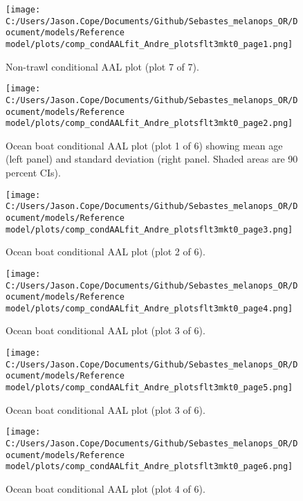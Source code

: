 \documentclass[11pt,
  english,
  letterpaper,
]{article}
\begin{document}
\begin{figure}
\centering
\texttt{[image: C:/Users/Jason.Cope/Documents/Github/Sebastes\_melanops\_OR/Document/models/Reference model/plots/comp\_condAALfit\_Andre\_plotsflt3mkt0\_page1.png]}
\caption{Non-trawl conditional AAL plot (plot 7 of 7).\label{fig:comp_condAALfit_Andre_plotsflt3mkt0_page1}}
\end{figure}

\begin{figure}
\centering
\texttt{[image: C:/Users/Jason.Cope/Documents/Github/Sebastes\_melanops\_OR/Document/models/Reference model/plots/comp\_condAALfit\_Andre\_plotsflt3mkt0\_page2.png]}
\caption{Ocean boat conditional AAL plot (plot 1 of 6) showing mean age (left panel) and standard deviation (right panel. Shaded areas are 90 percent CIs).\label{fig:comp_condAALfit_Andre_plotsflt3mkt0_page2}}
\end{figure}

\begin{figure}
\centering
\texttt{[image: C:/Users/Jason.Cope/Documents/Github/Sebastes\_melanops\_OR/Document/models/Reference model/plots/comp\_condAALfit\_Andre\_plotsflt3mkt0\_page3.png]}
\caption{Ocean boat conditional AAL plot (plot 2 of 6).\label{fig:comp_condAALfit_Andre_plotsflt3mkt0_page3}}
\end{figure}

\begin{figure}
\centering
\texttt{[image: C:/Users/Jason.Cope/Documents/Github/Sebastes\_melanops\_OR/Document/models/Reference model/plots/comp\_condAALfit\_Andre\_plotsflt3mkt0\_page4.png]}
\caption{Ocean boat conditional AAL plot (plot 3 of 6).\label{fig:comp_condAALfit_Andre_plotsflt3mkt0_page4}}
\end{figure}

\begin{figure}
\centering
\texttt{[image: C:/Users/Jason.Cope/Documents/Github/Sebastes\_melanops\_OR/Document/models/Reference model/plots/comp\_condAALfit\_Andre\_plotsflt3mkt0\_page5.png]}
\caption{Ocean boat conditional AAL plot (plot 3 of 6).\label{fig:comp_condAALfit_Andre_plotsflt3mkt0_page5}}
\end{figure}

\begin{figure}
\centering
\texttt{[image: C:/Users/Jason.Cope/Documents/Github/Sebastes\_melanops\_OR/Document/models/Reference model/plots/comp\_condAALfit\_Andre\_plotsflt3mkt0\_page6.png]}
\caption{Ocean boat conditional AAL plot (plot 4 of 6).\label{fig:comp_condAALfit_Andre_plotsflt3mkt0_page6}}
\end{figure}
\end{document}
